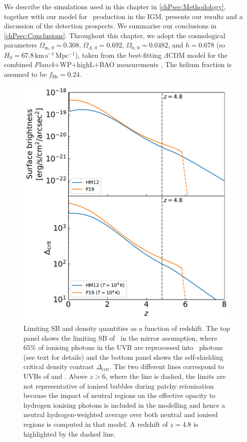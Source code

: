 We describe the simulations used in this chapter in \cref{chPsec:Methodology}, together with our model for \lya\ production in the IGM.  presents our results and a discussion of the detection prospects. We summarise our conclusions in \cref{chPsec:Conclusions}. Throughout this chapter, we adopt the cosmological parameters $\Omega_{\text{m}, \, 0} = 0.308$, $\Omega_{\Lambda, \, 0} = 0.692$, $\Omega_{\text{b}, \, 0} = 0.0482$, and $h=0.678$ (so $H_0 = 67.8 \, \mathrm{km \, s^{-1} \, Mpc^{-1}}$), taken from the best-fitting $\Lambda$CDM model for the combined \textit{Planck}+WP+highL+BAO measurements \citep{2014A&A...571A..16P}. The helium fraction is assumed to be $f_\text{He} = 0.24$.
\begin{figure}
    \centering
    \includegraphics[width=0.6\linewidth]{"Plots/ChapterP/UVB_limits"}
    \caption[Limiting SB and density quantities as a function of redshift]
    {Limiting SB and density quantities as a function of redshift. The top panel shows the limiting SB of \lya\ in the mirror assumption, where $65\%$ of ionising photons in the UVB are reprocessed into \lya\ photons (see text for details) and the bottom panel shows the self-shielding critical density contrast $\Delta_\text{crit}$. The two different lines correspond to UVBs of \citet[, ]{2012ApJ...746..125H} and \citet[, ]{2019MNRAS.485...47P}. Above $z>6$, where the line is dashed, the  limits are not representative of ionised bubbles during patchy reionisation because the impact of neutral regions on the effective opacity to hydrogen ionising photons is included in the modelling  and hence a neutral hydrogen-weighted average over both neutral and ionised regions is computed in that model. A redshift of $z=4.8$ is highlighted by the dashed line.}
    \label{chPfig:UVB_limits}
\end{figure}

